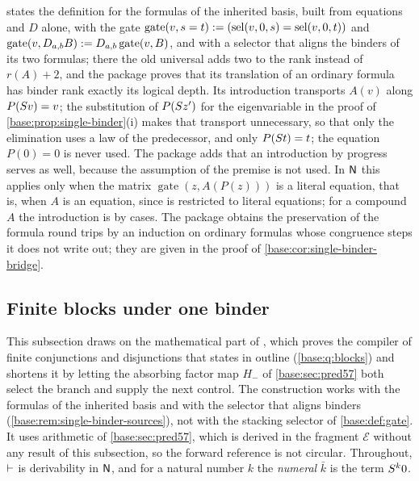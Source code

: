 \begin{remark}
\label{base:rem:single-binder-sources}
 states the definition for the formulas of the
inherited basis, built from equations and $D$ alone, with the gate
$\operatorname{gate}(v,s=t)\mathrel{:=}(\operatorname{sel}(v,0,s)=\operatorname{sel}(v,0,t))$ and
$\operatorname{gate}(v,D_{a,b}B)\mathrel{:=}D_{a,b}\operatorname{gate}(v,B)$,
and with a selector that aligns the binders of its two formulas; there the
old universal adds two to the rank instead of $r(A)+2$, and the package
proves that its translation of an ordinary formula has binder rank exactly
its logical depth.  Its introduction transports $A(v)$ along
$P(S v)=v$; the substitution of $P(S z')$ for the eigenvariable in
the proof of \cref{base:prop:single-binder}(i) makes that transport
unnecessary, so that only the elimination uses a law of the predecessor,
and only $P(S t)=t$; the equation $P(0)=0$ is never used.  The package
adds that an introduction by progress serves as well, because the
assumption of the premise is not used.  In $\mathsf{N}$ this applies only when
the matrix $\operatorname{gate}(z,A(P(z)))$ is a literal equation, that
is, when $A$ is an equation, since  is restricted to literal
equations; for a compound $A$ the introduction is by cases.  The package
obtains the preservation of the formula round trips by an induction on
ordinary formulas whose congruence steps it does not write out; they are
given in the proof of \cref{base:cor:single-binder-bridge}.
\end{remark}

\subsection{Finite blocks under one binder}
\label{base:sec:blocks}

This subsection draws on the mathematical part of
, which proves the compiler of finite
conjunctions and disjunctions that  states in
outline (\cref{base:q:blocks}) and shortens it by letting the absorbing
factor map $H_-$ of \cref{base:sec:pred57} both select the branch and supply
the next control.  The construction works with the formulas of the
inherited basis and with the selector that aligns binders
(\cref{base:rem:single-binder-sources}), not with the stacking selector of
\cref{base:def:gate}.  It uses arithmetic of \cref{base:sec:pred57}, which is
derived in the fragment $\mathcal E$ without any result of this subsection,
so the forward reference is not circular.  Throughout, $\vdash$ is
derivability in $\mathsf{N}$, and for a natural number $k$ the \emph{numeral}
$\bar k$ is the term $S^k0$.

